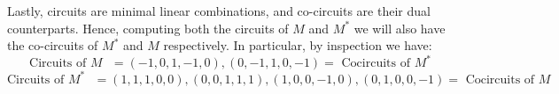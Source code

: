 Lastly, circuits are minimal linear combinations, and co-circuits are their dual counterparts.
Hence, computing both the circuits of $M$ and $M^*$ we will also have the co-circuits of $M^*$ and $M$ respectively.
In particular, by inspection we have:
\begin{equation*}
    \text{Circuits of $M$ } = (-1, 0, 1, -1, 0), (0, -1, 1, 0, -1) = \text{ Cocircuits of $M^*$}
\end{equation*}
\begin{equation*}
    \text{Circuits of $M^*$ } = (1, 1, 1, 0, 0), (0, 0, 1, 1, 1), (1, 0, 0, -1, 0), (0, 1, 0, 0, -1) = \text{ Cocircuits of $M$}
\end{equation*}
